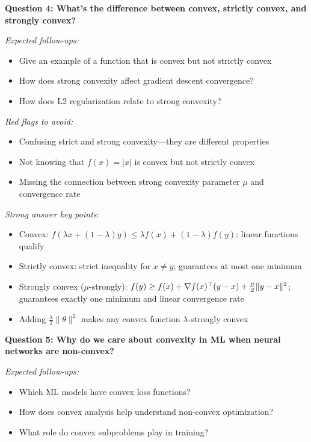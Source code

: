 \documentclass[../../main.tex]{subfiles}
\begin{document}
\begin{interviewquestions}
\vspace{0.5em}
\textbf{Question 4: What's the difference between convex, strictly convex, and strongly convex?}

\textit{Expected follow-ups:}
\begin{itemize}
    \item Give an example of a function that is convex but not strictly convex
    \item How does strong convexity affect gradient descent convergence?
    \item How does L2 regularization relate to strong convexity?
\end{itemize}

\textit{Red flags to avoid:}
\begin{itemize}
    \item Confusing strict and strong convexity---they are different properties
    \item Not knowing that $f(x) = |x|$ is convex but not strictly convex
    \item Missing the connection between strong convexity parameter $\mu$ and convergence rate
\end{itemize}

\textit{Strong answer key points:}
\begin{itemize}
    \item Convex: $f(\lambda x + (1-\lambda)y) \leq \lambda f(x) + (1-\lambda)f(y)$; linear functions qualify
    \item Strictly convex: strict inequality for $x \neq y$; guarantees at most one minimum
    \item Strongly convex ($\mu$-strongly): $f(y) \geq f(x) + \nabla f(x)^\top(y-x) + \frac{\mu}{2}\|y-x\|^2$; guarantees exactly one minimum and linear convergence rate
    \item Adding $\frac{\lambda}{2}\|\theta\|^2$ makes any convex function $\lambda$-strongly convex
\end{itemize}

\vspace{0.5em}
\textbf{Question 5: Why do we care about convexity in ML when neural networks are non-convex?}

\textit{Expected follow-ups:}
\begin{itemize}
    \item Which ML models have convex loss functions?
    \item How does convex analysis help understand non-convex optimization?
    \item What role do convex subproblems play in training?
\end{itemize}


\end{interviewquestions}
\end{document}
